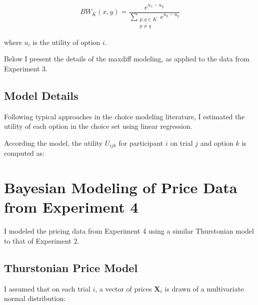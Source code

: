 \begin{equation}
   BW_{K}(x,y)=\frac{e^{u_{x}-u_{y}}}{\sum_{\substack{{p,q}\in K\\p \neq q}} e^{u_{p}-u_{q}}}   
   \label{eqn:maxdiff_equation1}
\end{equation}

where $u_{i}$ is the utility of option $i$. 

Below I present the details of the maxdiff modeling, as applied to the data from Experiment 3.

\section{Model Details}
Following typical approaches in the choice modeling literature, I estimated the utility of each option in the choice set using linear regression. 

According the model, the utility $U_{ijk}$ for participant $i$ on trial $j$ and option $k$ is computed as:




\chapter{Bayesian Modeling of Price Data from Experiment 4}

I modeled the pricing data from Experiment 4 using a similar Thurstonian model to that of Experiment 2.

\section{Thurstonian Price Model}

I assumed that on each trial $i$, a vector of prices $\textbf{X}_{i}$ is drawn of a multivariate normal distribution:

